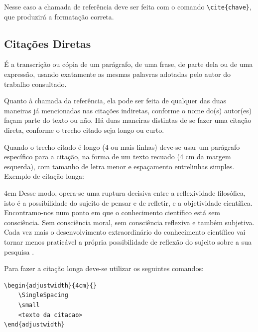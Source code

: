 Nesse caso a chamada de referência deve ser feita com o comando \verb|\cite{chave}|, que produzirá a formatação correta.

\subsection{Citações Diretas}
\label{subsec:citacoes_diretas}

É a transcrição ou cópia de um parágrafo, de uma frase, de parte dela ou de uma expressão, usando exatamente as mesmas palavras adotadas pelo autor do trabalho consultado.

Quanto à chamada da referência, ela pode ser feita de qualquer das duas maneiras já mencionadas nas citações indiretas, conforme o nome do(s) autor(es) façam parte do texto ou não. Há duas maneiras distintas de se fazer uma citação direta, conforme o trecho citado seja longo ou curto.

Quando o trecho citado é longo (4 ou mais linhas) deve-se usar um parágrafo específico para a citação, na forma de um texto recuado (4 cm da margem esquerda), com tamanho de letra menor e espaçamento entrelinhas simples. Exemplo de citação longa:

\begin{adjustwidth}{4cm}{}
    \SingleSpacing
    \small
    Desse modo, opera-se uma ruptura decisiva entre a reflexividade filosófica, isto é a possibilidade do sujeito de pensar e de refletir, e a objetividade científica. Encontramo-nos num ponto em que o conhecimento científico está sem consciência. Sem consciência moral, sem consciência reflexiva e também subjetiva. Cada vez mais o desenvolvimento extraordinário do conhecimento científico vai tornar menos praticável a própria possibilidade de reflexão do sujeito sobre a sua pesquisa \cite[p.~28]{SILVA_2000}.
\end{adjustwidth}

Para fazer a citação longa deve-se utilizar os seguintes comandos:
\begin{verbatim}
\begin{adjustwidth}{4cm}{}
    \SingleSpacing
    \small
    <texto da citacao>
\end{adjustwidth}
\end{verbatim}


